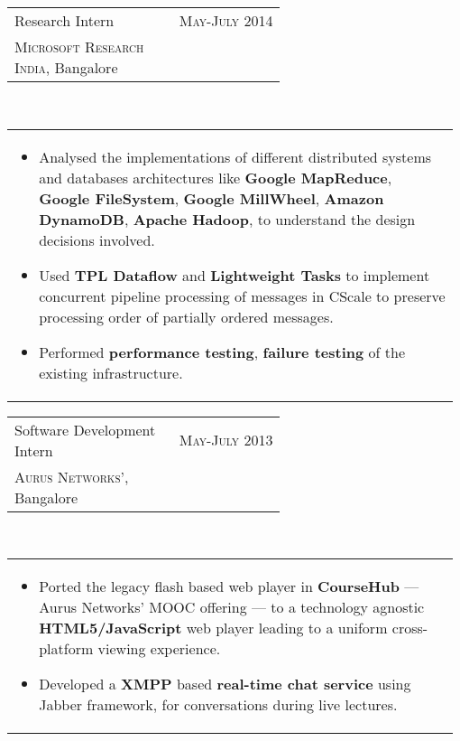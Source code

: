 \documentclass[a4paper]{article} %
\newcommand{\verticalspacing}{-0.25cm}
\newcommand{\bulletspace}{0.7cm}
\newcommand{\projectheadspacing}{6.9cm}
\newcommand{\cproject}[5]{%
    \begin{tabular}{p{0.60\linewidth}r}
        \textcolor{NavyBlue}{\small #2} & \multicolumn{1}{m{ \projectheadspacing{} }}{\raggedleft \small {\textsc{#1}}}\\
        \small {#3} & \small {#4}
    \end{tabular}\\
    \begin{tabular}{p{0.98\linewidth}}
    \vspace{-0.3cm}
        \small{#5}
    \end{tabular}
    \vspace{\verticalspacing{}}
}
\begin{document}
\cproject
      {May-July 2014}
      {Research Intern}
      {\textsc{Microsoft Research India}, Bangalore}
      {}
      {%
          \begin{itemize}[leftmargin=\bulletspace{}]
              \item Analysed the implementations of different distributed systems and databases architectures like
                  \textbf{Google MapReduce}, \textbf{Google FileSystem}, \textbf{Google MillWheel},
                  \textbf{Amazon DynamoDB}, \textbf{Apache Hadoop}, to understand the design decisions involved.
              \item Used \textbf{TPL Dataflow} and \textbf{Lightweight Tasks} to implement concurrent pipeline
                  processing of messages in CScale to preserve processing order of partially ordered messages.
              \item Performed \textbf{performance testing}, \textbf{failure testing} of the existing infrastructure.
          \end{itemize}
     }

\cproject
    {May-July 2013}
    {Software Development Intern}
    {\textsc{Aurus Networks'}, Bangalore}
    {}
    {%
        \begin{itemize}[leftmargin=\bulletspace{}]
            \item Ported the legacy flash based web player in \textbf{CourseHub} --- Aurus Networks'
                MOOC offering --- to a technology agnostic \textbf{HTML5/JavaScript} web player leading
                to a uniform cross-platform viewing experience.
            \item Developed a \textbf{XMPP} based \textbf{real-time chat service} using Jabber framework,
                for conversations during live lectures.
        \end{itemize}
    }


\end{document}
